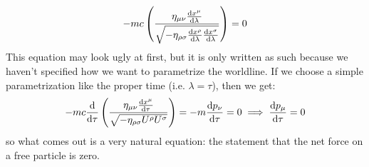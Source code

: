 \[
	-mc \left( \frac{\eta_{\mu \nu} \dv{x^{\mu}}{\lambda}}{\sqrt{-\eta_{\rho \sigma} 
	\dv{x^{\rho}}{\lambda} \dv{x^{\sigma}}{\lambda}}} \right) = 0
\]
This equation may look ugly at first, but it is only written as such because we haven't specified how we want
to parametrize the worldline. If we choose a simple parametrization like the proper time (i.e. \( \lambda =
\tau \)), then we get:
\[
	-mc \dv{\tau} \left( \frac{\eta_{\mu \nu} \dv{x^{\mu}}{\tau}}{\sqrt{-\eta_{\rho \sigma}
	U^{\rho}U^{\sigma}}} \right) = -m \dv{p_{\nu}}{\tau} = 0 \implies \dv{p_{\mu}}{\tau} = 0
\]
so what comes out is a very natural equation: the statement that the net force on a free particle is zero.  
 





 














